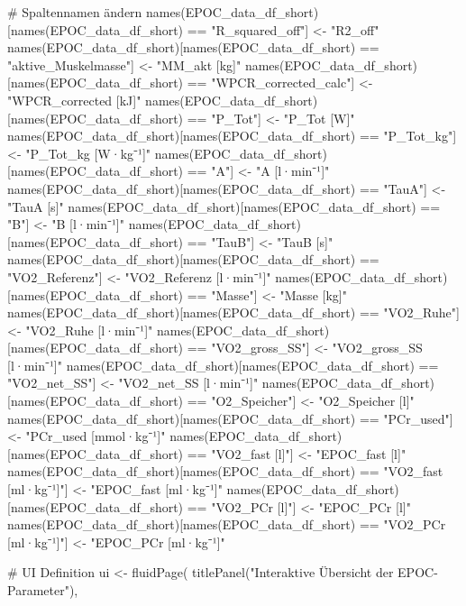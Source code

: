 \documentclass[
  letterpaper,
  DIV=11]{scrartcl}
\newenvironment{Shaded}{\begin{snugshade}}{\end{snugshade}}
\newcommand{\NormalTok}[1]{\textcolor[rgb]{0.00,0.23,0.31}{#1}}
\begin{document}
\begin{Shaded}
\begin{Highlighting}[]
\NormalTok{\# Spaltennamen ändern}
\NormalTok{names(EPOC\_data\_df\_short)[names(EPOC\_data\_df\_short) == "R\_squared\_off"] \textless{}{-} "R2\_off"}
\NormalTok{names(EPOC\_data\_df\_short)[names(EPOC\_data\_df\_short) == "aktive\_Muskelmasse"] \textless{}{-} "MM\_akt [kg]"}
\NormalTok{names(EPOC\_data\_df\_short)[names(EPOC\_data\_df\_short) == "WPCR\_corrected\_calc"] \textless{}{-} "WPCR\_corrected [kJ]"}
\NormalTok{names(EPOC\_data\_df\_short)[names(EPOC\_data\_df\_short) == "P\_Tot"] \textless{}{-} "P\_Tot [W]"}
\NormalTok{names(EPOC\_data\_df\_short)[names(EPOC\_data\_df\_short) == "P\_Tot\_kg"] \textless{}{-} "P\_Tot\_kg [W·kg⁻¹]"}
\NormalTok{names(EPOC\_data\_df\_short)[names(EPOC\_data\_df\_short) == "A"] \textless{}{-} "A [l·min⁻¹]"}
\NormalTok{names(EPOC\_data\_df\_short)[names(EPOC\_data\_df\_short) == "TauA"] \textless{}{-} "TauA [s]"}
\NormalTok{names(EPOC\_data\_df\_short)[names(EPOC\_data\_df\_short) == "B"] \textless{}{-} "B [l·min⁻¹]"}
\NormalTok{names(EPOC\_data\_df\_short)[names(EPOC\_data\_df\_short) == "TauB"] \textless{}{-} "TauB [s]"}
\NormalTok{names(EPOC\_data\_df\_short)[names(EPOC\_data\_df\_short) == "VO2\_Referenz"] \textless{}{-} "VO2\_Referenz [l·min⁻¹]"}
\NormalTok{names(EPOC\_data\_df\_short)[names(EPOC\_data\_df\_short) == "Masse"] \textless{}{-} "Masse [kg]"}
\NormalTok{names(EPOC\_data\_df\_short)[names(EPOC\_data\_df\_short) == "VO2\_Ruhe"] \textless{}{-} "VO2\_Ruhe [l·min⁻¹]"}
\NormalTok{names(EPOC\_data\_df\_short)[names(EPOC\_data\_df\_short) == "VO2\_gross\_SS"] \textless{}{-} "VO2\_gross\_SS [l·min⁻¹]"}
\NormalTok{names(EPOC\_data\_df\_short)[names(EPOC\_data\_df\_short) == "VO2\_net\_SS"] \textless{}{-} "VO2\_net\_SS [l·min⁻¹]"}
\NormalTok{names(EPOC\_data\_df\_short)[names(EPOC\_data\_df\_short) == "O2\_Speicher"] \textless{}{-} "O2\_Speicher [l]"}
\NormalTok{names(EPOC\_data\_df\_short)[names(EPOC\_data\_df\_short) == "PCr\_used"] \textless{}{-} "PCr\_used [mmol·kg⁻¹]"}
\NormalTok{names(EPOC\_data\_df\_short)[names(EPOC\_data\_df\_short) == "VO2\_fast [l]"] \textless{}{-} "EPOC\_fast [l]"}
\NormalTok{names(EPOC\_data\_df\_short)[names(EPOC\_data\_df\_short) == "VO2\_fast [ml·kg⁻¹]"] \textless{}{-} "EPOC\_fast [ml·kg⁻¹]"}
\NormalTok{names(EPOC\_data\_df\_short)[names(EPOC\_data\_df\_short) == "VO2\_PCr [l]"] \textless{}{-} "EPOC\_PCr [l]"}
\NormalTok{names(EPOC\_data\_df\_short)[names(EPOC\_data\_df\_short) == "VO2\_PCr [ml·kg⁻¹]"] \textless{}{-} "EPOC\_PCr [ml·kg⁻¹]"}

\NormalTok{\# UI Definition}
\NormalTok{ui \textless{}{-} fluidPage(}
\NormalTok{  titlePanel("Interaktive Übersicht der EPOC{-}Parameter"),}
  

\end{Highlighting}
\end{Shaded}
\end{document}
